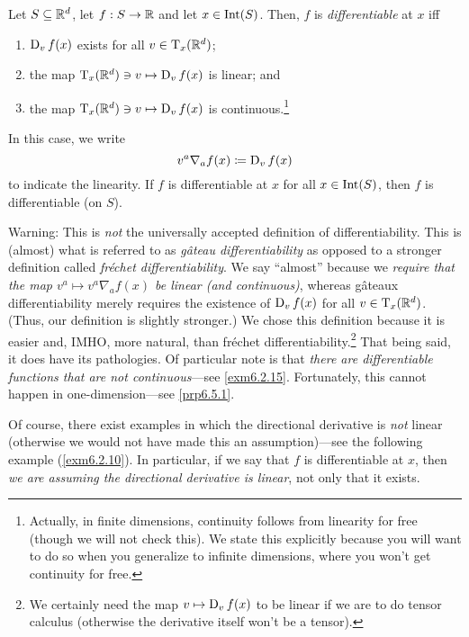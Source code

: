\begin{dfn}\label{Derivative}
Let $S\subseteq \R ^d$, let $f:S\rightarrow \R$ and let $x\in \Int (S)$.  Then, $f$ is \emph{differentiable} at $x$ iff
\begin{enumerate}
\item $\D _vf(x)$ exists for all $v\in \tangent{\R ^d}{x}$;
\item the map $\tangent{\R ^d}{x}\ni v\mapsto \D _vf(x)$ is linear; and
\item the map $\tangent{\R ^d}{x}\ni v \mapsto \D _vf(x)$ is continuous.\footnote{Actually, in finite dimensions, continuity follows from linearity for free (though we will not check this).  We state this explicitly because you will want to do so when you generalize to infinite dimensions, where you won't get continuity for free.}
\end{enumerate}
In this case, we write
\begin{equation}
v^a\nabla _af(x)\coloneqq \D _vf(x)
\end{equation}
 to indicate the linearity.  If $f$ is differentiable at $x$ for all $x\in \Int (S)$, then $f$ is differentiable (on $S$).
\begin{rmk}
Warning:  This is \emph{not} the universally accepted definition of differentiability.  This is (almost) what is referred to as \emph{g\^{a}teau differentiability} as opposed to a stronger definition called \emph{fr\'{e}chet differentiability}.  We say ``almost'' because we \emph{require that the map $v^a\mapsto v^a\nabla _af(x)$ be linear (and continuous)}, whereas g\^{a}teaux differentiability merely requires the existence of $\D _vf(x)$ for all $v\in \tangent{\R ^d}{x}$.  (Thus, our definition is slightly stronger.)  We chose this definition because it is easier and, IMHO, more natural, than fr\'{e}chet differentiability.\footnote{We certainly need the map $v\mapsto \D _vf(x)$ to be linear if we are to do tensor calculus (otherwise the derivative itself won't be a tensor).}  That being said, it does have its pathologies.  Of particular note is that \emph{there are differentiable functions that are not continuous}---see \cref{exm6.2.15}.  Fortunately, this cannot happen in one-dimension---see \cref{prp6.5.1}.
\end{rmk}
\begin{rmk}
Of course, there exist examples in which the directional derivative is \emph{not} linear (otherwise we would not have made this an assumption)---see the following example (\cref{exm6.2.10}).  In particular, if we say that $f$ is differentiable at $x$, then \emph{we are assuming the directional derivative is linear}, not only that it exists.


\end{rmk}
\end{dfn}
